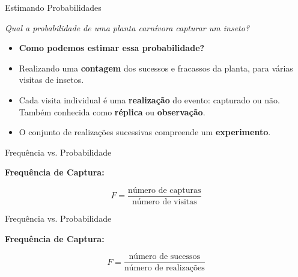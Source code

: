 \documentclass{beamer}\usepackage[]{graphicx}\usepackage[]{color}
\begin{document}
\begin{frame}{Estimando Probabilidades}

\emph{Qual a probabilidade de uma planta carnívora capturar um inseto?}

\begin{itemize}
  \item \textbf{Como podemos estimar essa probabilidade?} \pause
  \vfill
  \item Realizando uma \textbf{contagem} dos sucessos e fracassos da planta, para várias visitas de insetos.\pause
  \vfill
  \item Cada visita individual é uma \textbf{realização} do evento: capturado ou não. Também conhecida como \textbf{réplica} ou \textbf{observação}.\pause
  \vfill
  \item O conjunto de realizações sucessivas compreende um \textbf{experimento}.
\end{itemize}

\end{frame} 


\begin{frame}{Frequência vs. Probabilidade}

\begin{centering}

\textbf{Frequência de Captura:}

\begin{equation*}
    F  = \frac{\text{número de capturas}}{\text{número de visitas}}
\end{equation*}


\end{centering}

\end{frame} 


\begin{frame}{Frequência vs. Probabilidade}

\begin{centering}

\textbf{Frequência de Captura:}

\begin{equation*}
    F = \frac{\text{número de sucessos}}{\text{número de realizações}}
\end{equation*}


\end{centering}

\end{frame} 
\end{document}
